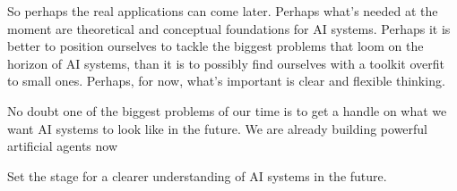 So perhaps the real applications can come later. 
Perhaps what's needed at the moment are theoretical and conceptual foundations for AI systems. 
Perhaps it is better to position ourselves to tackle the biggest problems that loom on the horizon of AI systems, than it is to possibly find ourselves with a toolkit overfit to small ones. 
Perhaps, for now, what's important is clear and flexible thinking. 


No doubt one of the biggest problems of our time is to get a handle on what we want AI systems to look like in the future.  We are already building powerful artificial agents now 


Set the stage for a clearer understanding of AI systems in the future.

